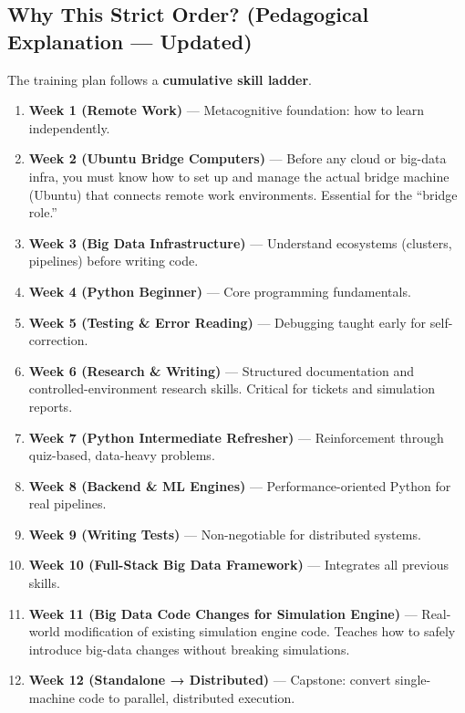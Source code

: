 \documentclass[12pt]{article}
\begin{document}
	\subsection*{Why This Strict Order? (Pedagogical Explanation — Updated)}
	
	The training plan follows a \textbf{cumulative skill ladder}.
	
	\begin{enumerate}
		\item \textbf{Week 1 (Remote Work)} — Metacognitive foundation: how to learn independently.
		
		\item \textbf{Week 2 (Ubuntu Bridge Computers)} — Before any cloud or big-data infra, you must know how to set up and manage the actual bridge machine (Ubuntu) that connects remote work environments. Essential for the “bridge role.”
		
		\item \textbf{Week 3 (Big Data Infrastructure)} — Understand ecosystems (clusters, pipelines) before writing code.
		
		\item \textbf{Week 4 (Python Beginner)} — Core programming fundamentals.
		
		\item \textbf{Week 5 (Testing \& Error Reading)} — Debugging taught early for self-correction.
		
		\item \textbf{Week 6 (Research \& Writing)} — Structured documentation and controlled-environment research skills. Critical for tickets and simulation reports.
		
		\item \textbf{Week 7 (Python Intermediate Refresher)} — Reinforcement through quiz-based, data-heavy problems.
		
		\item \textbf{Week 8 (Backend \& ML Engines)} — Performance-oriented Python for real pipelines.
		
		\item \textbf{Week 9 (Writing Tests)} — Non-negotiable for distributed systems.
		
		\item \textbf{Week 10 (Full-Stack Big Data Framework)} — Integrates all previous skills.
		
		\item \textbf{Week 11 (Big Data Code Changes for Simulation Engine)} — Real-world modification of existing simulation engine code. Teaches how to safely introduce big-data changes without breaking simulations.
		
		\item \textbf{Week 12 (Standalone → Distributed)} — Capstone: convert single-machine code to parallel, distributed execution.
	\end{enumerate}
	
\end{document}
